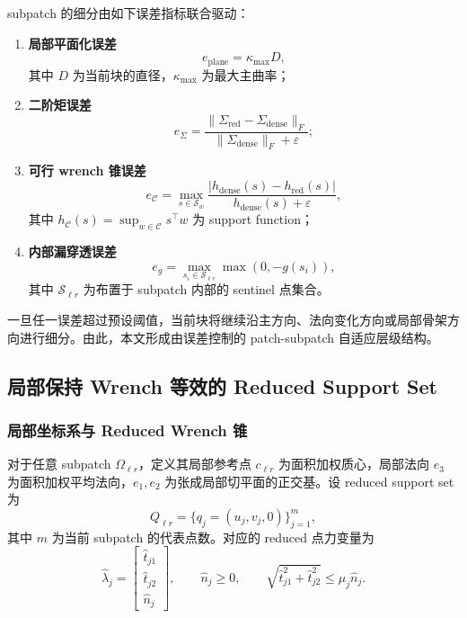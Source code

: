 \documentclass[UTF8,a4paper,11pt]{ctexart}
\begin{document}
subpatch 的细分由如下误差指标联合驱动：
\begin{enumerate}[label=(\roman*)]
    \item \textbf{局部平面化误差}
    \begin{equation}
    e_{\mathrm{plane}} = \kappa_{\max} D,
    \end{equation}
    其中 $D$ 为当前块的直径，$\kappa_{\max}$ 为最大主曲率；

    \item \textbf{二阶矩误差}
    \begin{equation}
    e_{\Sigma}
    =
    \frac{\|\Sigma_{\mathrm{red}}-\Sigma_{\mathrm{dense}}\|_F}
    {\|\Sigma_{\mathrm{dense}}\|_F+\varepsilon};
    \end{equation}

    \item \textbf{可行 wrench 锥误差}
    \begin{equation}
    e_{\mathcal{C}}
    =
    \max_{s\in\mathcal{S}_w}
    \frac{|h_{\mathrm{dense}}(s)-h_{\mathrm{red}}(s)|}
    {h_{\mathrm{dense}}(s)+\varepsilon},
    \end{equation}
    其中 $h_{\mathcal{C}}(s)=\sup_{w\in\mathcal{C}} s^\top w$ 为 support function；

    \item \textbf{内部漏穿透误差}
    \begin{equation}
    e_g = \max_{s_i\in \mathcal{S}_{\ell r}} \max(0,-g(s_i)),
    \end{equation}
    其中 $\mathcal{S}_{\ell r}$ 为布置于 subpatch 内部的 sentinel 点集合。
\end{enumerate}

一旦任一误差超过预设阈值，当前块将继续沿主方向、法向变化方向或局部骨架方向进行细分。由此，本文形成由误差控制的 patch-subpatch 自适应层级结构。

\subsection{局部保持 Wrench 等效的 Reduced Support Set}

\subsubsection{局部坐标系与 Reduced Wrench 锥}

对于任意 subpatch $\Omega_{\ell r}$，定义其局部参考点 $c_{\ell r}$ 为面积加权质心，局部法向 $e_3$ 为面积加权平均法向，$e_1,e_2$ 为张成局部切平面的正交基。设 reduced support set 为
\begin{equation}
Q_{\ell r}=\{q_j=(u_j,v_j,0)\}_{j=1}^{m},
\end{equation}
其中 $m$ 为当前 subpatch 的代表点数。对应的 reduced 点力变量为
\begin{equation}
\hat{\lambda}_j=
\begin{bmatrix}
\hat{t}_{j1}\\
\hat{t}_{j2}\\
\hat{n}_j
\end{bmatrix},
\qquad
\hat{n}_j\ge0,
\qquad
\sqrt{\hat{t}_{j1}^2+\hat{t}_{j2}^2}\le \mu_j \hat{n}_j.
\end{equation}
\end{document}
